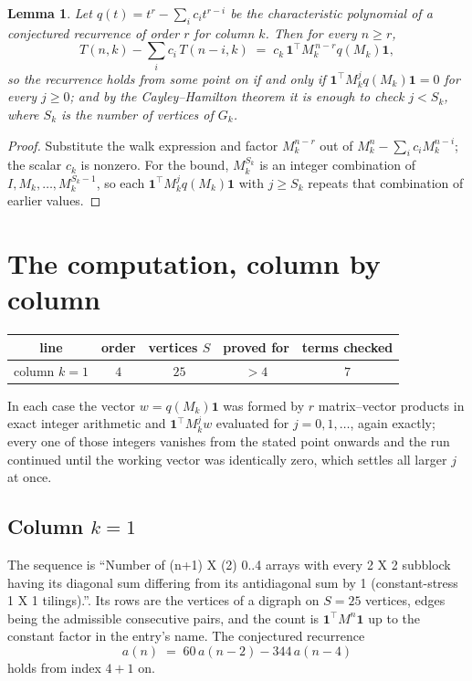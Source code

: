 \documentclass[11pt,a4paper]{article}
\theoremstyle{plain}
\newtheorem{lemma}[theorem]{Lemma}
\theoremstyle{definition}
\begin{document}
\begin{lemma}\label{lem:crit}
Let $q(t)=t^{r}-\sum_i c_it^{r-i}$ be the characteristic polynomial of a conjectured
recurrence of order $r$ for column $k$. Then for every $n\ge r$,
\[
T(n,k)-\sum_i c_i\,T(n-i,k)\;=\;c_k\,\mathbf{1}^{\!\top}M_k^{\,n-r}q(M_k)\mathbf{1},
\]
so the recurrence holds from some point on if and only if
$\mathbf{1}^{\!\top}M_k^{j}q(M_k)\mathbf{1}=0$ for every $j\ge0$; and by the
Cayley--Hamilton theorem it is enough to check $j<S_k$, where $S_k$ is the number of vertices
of $G_k$.
\end{lemma}

\begin{proof}
Substitute the walk expression and factor $M_k^{n-r}$ out of $M_k^{n}-\sum_ic_iM_k^{n-i}$;
the scalar $c_k$ is nonzero. For the bound, $M_k^{S_k}$ is an integer combination of
$I,M_k,\dots,M_k^{S_k-1}$, so each $\mathbf{1}^{\!\top}M_k^{j}q(M_k)\mathbf{1}$ with
$j\ge S_k$ repeats that combination of earlier values.
\end{proof}

\section{The computation, column by column}

\begin{center}
\begin{tabular}{ccccc}
line & order & vertices $S$ & proved for & terms checked \\ \hline
column $k$$=1$ & $4$ & $25$ & $>4$ & $7$ \\
\end{tabular}
\end{center}

In each case the vector $w=q(M_k)\mathbf{1}$ was formed by $r$ matrix--vector products in
exact integer arithmetic and $\mathbf{1}^{\!\top}M_k^{j}w$ evaluated for $j=0,1,\dots$,
again exactly; every one of those integers vanishes from the stated point onwards and the run
continued until the working vector was identically zero, which settles all larger $j$ at once.

\subsection*{Column $k$$=1$}
The sequence is ``Number of (n+1) X (2) 0..4 arrays with every 2 X 2 subblock having its diagonal sum differing from its antidiagonal sum by 1 (constant-stress 1 X 1 tilings).''. Its rows are the vertices of a digraph on
$S=25$ vertices, edges being the admissible consecutive pairs, and the count is
$\mathbf{1}^{\!\top}M^{n}\mathbf{1}$ up to the constant factor in the entry's name.
The conjectured recurrence
\[
a(n)\;=\;60\,a(n-2) - 344\,a(n-4)
\]
holds from index $4+1$ on.
\end{document}
